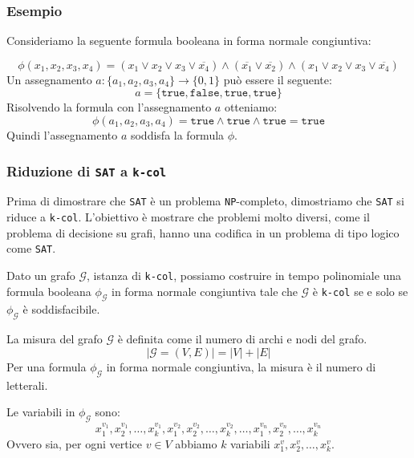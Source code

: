 \subsubsection{Esempio}
Consideriamo la seguente formula booleana in forma normale congiuntiva:

\[
\phi(x_1, x_2, x_3, x_4) = (x_1 \lor x_2 \lor x_3 \lor \overline{x_4}) \land 
(\overline{x_1} \lor \overline{x_2}) \land (x_1 \lor x_2 \lor x_3 \lor \overline{x_4})
\]
Un assegnamento $a: \{a_1, a_2, a_3, a_4\} \to \{0, 1\}$ può essere il seguente:
\[
a = \{\texttt{true}, \texttt{false}, \texttt{true}, \texttt{true}\}
\]
Risolvendo la formula con l'assegnamento $a$ otteniamo:
\[
\phi(a_1, a_2, a_3, a_4) = \texttt{true} \land \texttt{true} \land \texttt{true} = \texttt{true}
\]
Quindi l'assegnamento $a$ soddisfa la formula $\phi$.

\subsubsection{Riduzione di \texttt{SAT} a \texttt{k-col}}
Prima di dimostrare che \texttt{SAT} è un problema \texttt{NP}-completo, dimostriamo
che \texttt{SAT} si riduce a \texttt{k-col}. L'obiettivo è mostrare che problemi molto 
diversi, come il problema di decisione su grafi, hanno una codifica in un problema 
di tipo logico come \texttt{SAT}.
\begin{tcolorbox}
    Dato un grafo $\mathcal{G}$, istanza di \texttt{k-col}, possiamo costruire in 
    tempo polinomiale una formula booleana $\phi_\mathcal{G}$ in forma normale congiuntiva
    tale che $\mathcal{G}$ è \texttt{k-col} se e solo se $\phi_\mathcal{G}$ è soddisfacibile.
\end{tcolorbox}
La misura del grafo $\mathcal{G}$ è definita come il numero di archi e nodi del grafo.
\[
    |\mathcal{G}=(V, E)| = |V| + |E|  
\]
Per una formula $\phi_\mathcal{G}$ in forma normale congiuntiva, la misura è il numero
    di letterali.

    Le variabili in $\phi_\mathcal{G}$ sono:
    \[
        x_1^{v_1}, x_2^{v_1}, \dots, x_k^{v_1}, x_1^{v_2},
        x_2^{v_2}, \dots, x_k^{v_2}, \dots, x_1^{v_n}, x_2^{v_n}, \dots, x_k^{v_n}
    \]
    Ovvero sia, per ogni vertice $v \in V$ abbiamo $k$ variabili $x_1^v, x_2^v, \dots, x_k^v$.
    

